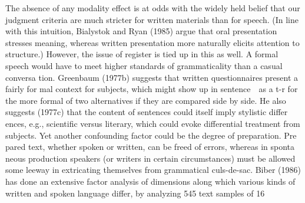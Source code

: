 \begin{styleTextbody}
The absence of any modality effect is at odds with the widely held belief that our judgment criteria are much stricter for written materials than for speech. (In line with this intuition, Bialystok and Ryan (1985) argue that oral presentation stresses meaning, whereas written presentation more naturally elicits attention to structure.) However, the issue of register is tied up in this as well. A formal speech would have to meet higher standards of grammaticality than a casual conversa\- tion. Greenbaum (1977b) suggests that written questionnaires present a fairly for\- mal context for subjects, which might show up in sentence\ \ as a {\textquotedbl}{\textquotesingle}{\textquotesingle}{\textquotedbl}{\textquotesingle}{\textquotesingle}t{\textquotedbl}-r{\textquotedbl}{\textquotedbl}{\textquotesingle}{\textquotedbl}{\textquotedbl}{\textquotesingle} for the more formal of two alternatives if they are compared side by side. He also suggests (1977c) that the content of sentences could itself imply stylistic differ\- ences, e.g., scientific versus literary, which could evoke differential treatment from subjects. Yet another confounding factor could be the degree of preparation. Pre\- pared text, whether spoken or written, can be freed of errors, whereas in sponta\- neous production speakers (or writers in certain circumstances) must be allowed some leeway in extricating themselves from grammatical culs-de-sac. Biber (1986) has done an extensive factor analysis of dimensions along which various kinds of written and spoken language differ, by analyzing 545 text samples of 16
\end{styleTextbody}


